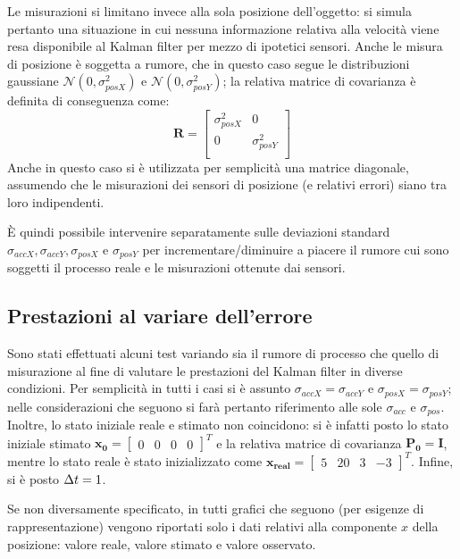 Le misurazioni si limitano invece alla sola posizione dell'oggetto: si simula pertanto una situazione in cui nessuna informazione relativa alla velocità viene resa disponibile al Kalman filter per mezzo di ipotetici sensori. 
Anche le misura di posizione è soggetta a rumore, che in questo caso segue le distribuzioni gaussiane $\mathcal{N}(0,\sigma^2_{posX})$ e $\mathcal{N}(0,\sigma^2_{posY})$; la relativa matrice di covarianza è definita di conseguenza come:
\begin{equation*}
\textbf{R} = 
\begin{bmatrix}
\sigma^2_{posX} & 0 \\
0 & \sigma^2_{posY} \\
\end{bmatrix}
\end{equation*}
Anche in questo caso si è utilizzata per semplicità una matrice diagonale, assumendo che le misurazioni dei sensori di posizione (e relativi errori) siano tra loro indipendenti.

È quindi possibile intervenire separatamente sulle deviazioni standard $\sigma_{accX}, \sigma_{accY}, \sigma_{posX}$ e $\sigma_{posY}$ per incrementare/diminuire a piacere il rumore cui sono soggetti il processo reale e le misurazioni ottenute dai sensori.

\subsection{Prestazioni al variare dell'errore}

Sono stati effettuati alcuni test variando sia il rumore di processo che quello di misurazione al fine di valutare le prestazioni del Kalman filter in diverse condizioni. Per semplicità in tutti i casi si è assunto $\sigma_{accX} = \sigma_{accY}$ e $\sigma_{posX} = \sigma_{posY}$;
nelle considerazioni che seguono si farà pertanto riferimento alle sole $\sigma_{acc}$ e $\sigma_{pos}$. Inoltre, lo stato iniziale reale e stimato non coincidono: si è infatti posto lo stato iniziale stimato $\mathbf{x_0} = \begin{bmatrix} 0 & 0 & 0 & 0 \end{bmatrix}^T$ e la relativa matrice di covarianza $\mathbf{P_0 = I}$, mentre lo stato reale è stato inizializzato come $\mathbf{x_{real}} = \begin{bmatrix} 5 & 20 & 3 & -3 \end{bmatrix}^T$. Infine, si è posto $\Delta t = 1$.

Se non diversamente specificato, in tutti grafici che seguono (per esigenze di rappresentazione) vengono riportati solo i dati relativi alla componente $x$ della posizione: valore reale, valore stimato e valore osservato.

